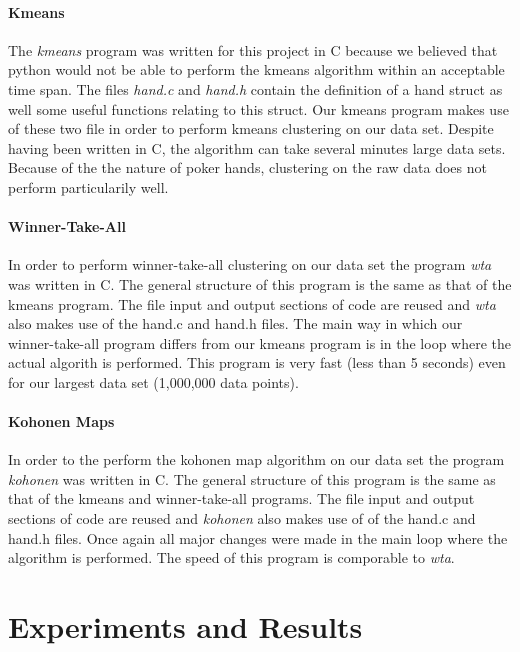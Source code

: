 \documentclass{article}
\begin{document}
\paragraph{Kmeans} 
The \textit{kmeans} program was written for this project in C because we believed
that python would not be able to perform the kmeans algorithm within an acceptable 
time span. The files \textit{hand.c} and \textit{hand.h} contain the definition of
a hand struct as well some useful functions relating to this struct. Our kmeans 
program makes use of these two file in order to perform kmeans clustering on our data
set. Despite having been written in C, the algorithm can take several minutes large data 
sets. Because of the the nature of poker hands, clustering on the raw data does not 
perform particularily well.

\paragraph{Winner-Take-All}
In order to perform winner-take-all clustering on our data set the program \textit{wta} was
written in C. The general structure of this program is the same as that of the kmeans program.
The file input and output sections of code are reused and \textit{wta} also makes use of
the hand.c and hand.h files. The main way in which our winner-take-all program differs from
our kmeans program is in the loop where the actual algorith is performed. This program is 
very fast (less than 5 seconds) even for our largest data set (1,000,000 data points). 

\paragraph{Kohonen Maps}
In order to the perform the kohonen map algorithm on our data set the program \textit{kohonen} was
written in C. The general structure of this program is the same as that of the kmeans and
winner-take-all programs. The file input and output sections of code are reused and 
\textit{kohonen} also makes use of of the hand.c and hand.h files. Once again all major
changes were made in the main loop where the algorithm is performed. The speed of this program
is comporable to \textit{wta}.


\newpage
\section*{Experiments and Results}
\end{document}
